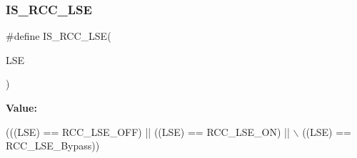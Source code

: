\subsubsection{\texorpdfstring{I\+S\+\_\+\+R\+C\+C\+\_\+\+L\+SE}{IS\_RCC\_LSE}}
{\footnotesize\ttfamily \#define I\+S\+\_\+\+R\+C\+C\+\_\+\+L\+SE(\begin{DoxyParamCaption}\item[{}]{L\+SE }\end{DoxyParamCaption})}

{\bfseries Value\+:}
\begin{DoxyCode}
(((LSE) == RCC\_LSE\_OFF) || ((LSE) == RCC\_LSE\_ON) || \(\backslash\)
                         ((LSE) == RCC\_LSE\_Bypass))
\end{DoxyCode}
